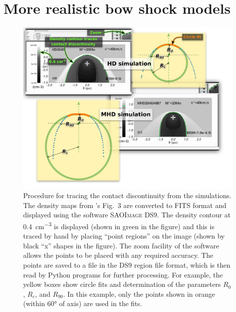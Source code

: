 \section{More realistic bow shock models}
\label{sec:more-realistic-bow}

\begin{figure}
  \centering
  \includegraphics[width=\linewidth]{figs/M17-composite}
  \caption[]{Procedure for tracing the contact discontinuity from the
    \citet{Meyer:2017a} simulations.  The density maps from
    \citeauthor{Meyer:2017a}'s Fig.~3 are converted to FITS format and
    displayed using the software \textsc{SAOImage DS9}.  The density
    contour at \SI{0.4}{cm^{-3}} is displayed (shown in green in the
    figure) and this is traced by hand by placing ``point regions'' on
    the image (shown by black ``x'' shapes in the figure).  The zoom
    facility of the software allows the points to be placed with any
    required accuracy.  The points are saved to a file in the DS9
    region file format, which is then read by Python programs for
    further processing.  For example, the yellow boxes show circle
    fits and determination of the parameters \(R_0\), \(R_c\), and
    \(R_{90}\).  In this example, only the points shown in orange
    (within \ang{60} of axis) are used in the fits.}
  \label{fig:meyer-trace}
\end{figure}


